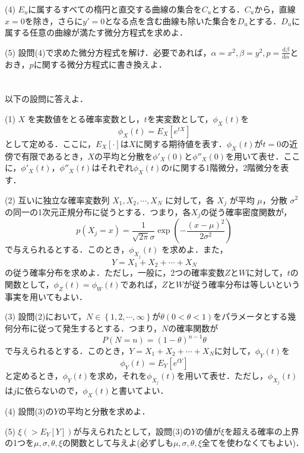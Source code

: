 \documentclass[a4j]{jarticle}
\let \ds \displaystyle
\newcommand{\diff}[3]{
  \frac{\mathrm{d}^{#1} #2}{\mathrm{d} #3^{#1}}
}
\begin{document}
\begin{screen}
 (4) $E_u$に属するすべての楕円と直交する曲線の集合を$C_u$とする．$C_u$から，直線$x=0$を除き，さらに$y'=0$となる点を含む曲線も除いた集合を$D_u$とする．$D_u$に属する任意の曲線が満たす微分方程式を求めよ．
\end{screen}

\begin{screen}
 (5) 設問(4)で求めた微分方程式を解け．必要であれば，$\ds \alpha=x^2, \beta=y^2, p=\diff{}{\beta}{\alpha}$とおき，$p$に関する微分方程式に書き換えよ．
\end{screen}

\section{}

\begin{screen}
 以下の設問に答えよ．
\end{screen}

\begin{screen}
 (1) $X$ を実数値をとる確率変数とし，$t$を実変数として，$\phi_X(t)$を
 $$\phi_X(t) = E_X\left[e^{tX}\right]$$
 として定める．ここに，$E_X\left[\cdot\right]$は$X$に関する期待値を表す．$\phi_X(t)$が$t=0$の近傍で有限であるとき，$X$の平均と分散を$\phi'_X(0)$と$\phi''_X(0)$を用いて表せ．ここに，$\phi'_X(t)$，$\phi''_X(t)$はそれぞれ$\phi_X(t)$の$t$に関する1階微分，2階微分を表す．
\end{screen}

\begin{screen}
 (2) 互いに独立な確率変数列 $X_1,X_2,\cdots,X_N$ に対して，各 $X_j$ が平均 $\mu$，分散 $\sigma^2$ の同一の1次元正規分布に従うとする．つまり，各$X_j$の従う確率密度関数が，
 $$p(X_j=x) = \frac{1}{\sqrt{2 \pi}\sigma}\exp\left(- \frac{(x-\mu)^2}{2\sigma^2}\right)$$
 で与えられるとする．このとき，$\phi_{X_j}(t)$ を求めよ．また，
 $$ Y = X_1 + X_2 + \cdots + X_N$$
 の従う確率分布を求めよ．ただし，一般に，2つの確率変数$Z$と$W$に対して，$t$の関数として，$\phi_Z(t)=\phi_W(t)$であれば，$Z$と$W$が従う確率分布は等しいという事実を用いてもよい．
\end{screen}

\begin{screen}
 (3) 設問(2)において，$N\in \left\{1,2,\cdots,\infty\right\}$が$\theta(0<\theta<1)$をパラメータとする幾何分布に従って発生するとする．つまり，$N$の確率関数が
 $$P(N=n) = (1-\theta)^{n-1}\theta$$
 で与えられるとする．このとき，$Y=X_1+X_2+\cdots+X_N$に対して，$\phi_Y(t)$を
 $$\phi_Y(t) = E_Y\left[e^{tY}\right]$$
 と定めるとき，$\phi_Y(t)$を求め，それを$\phi_{X_j}(t)$を用いて表せ．ただし，$\phi_{X_j}(t)$は$j$に依らないので，$\phi_X(t)$と書いてよい．
\end{screen}

\begin{screen}
 (4) 設問(3)の$Y$の平均と分散を求めよ．
\end{screen}

\begin{screen}
 (5) $\xi(>E_Y\left[Y\right])$が与えられたとして，設問(3)の$Y$の値が$\xi$を超える確率の上界の1つを$\mu,\sigma,\theta,\xi$の関数として与えよ(必ずしも$\mu,\sigma,\theta,\xi$全てを使わなくてもよい)．
\end{screen}
\end{document}
